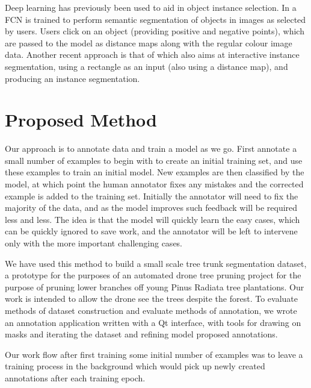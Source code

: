 Deep learning has previously been used to aid in object instance selection. In \cite{Xu2016} a \gls{FCN} is trained to perform semantic segmentation of objects in images as selected by users. Users click on an object (providing positive and negative points), which are passed to the model as distance maps along with the regular colour image data. Another recent approach is that of \cite{Xu2017} which also aims at interactive instance segmentation, using a rectangle as an input (also using a distance map), and producing an instance segmentation.






\section{Proposed Method}

Our approach is to annotate data and train a model as we go. First annotate a small number of examples to begin with to create an initial training set, and use these examples to train an initial model. New examples are then classified by the model, at which point the human annotator fixes any mistakes and the corrected example is added to the training set. Initially the annotator will need to fix the majority of the data, and as the model improves such feedback will be required less and less. The idea is that the model will quickly learn the easy cases, which can be quickly ignored to save work, and the annotator will be left to intervene only with the more important challenging cases.

We have used this method to build a small scale tree trunk segmentation dataset, a prototype for the purposes of an automated drone tree pruning project for the purpose of pruning lower branches off young Pinus Radiata tree plantations. Our work is intended to allow the drone see the trees despite the forest. To evaluate methods of dataset construction and evaluate methods of annotation, we wrote an annotation application written with a Qt interface, with tools for drawing on masks and iterating the dataset and refining model proposed annotations.

Our work flow after first training some initial number of examples was to leave a training process in the background which would pick up newly created annotations after each training epoch. 


